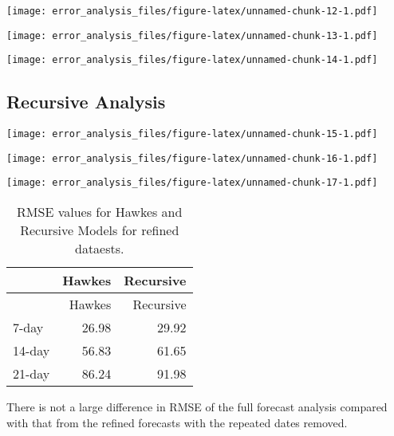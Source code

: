\documentclass[
]{article}
\begin{document}
\texttt{[image: error\_analysis\_files/figure-latex/unnamed-chunk-12-1.pdf]}

\texttt{[image: error\_analysis\_files/figure-latex/unnamed-chunk-13-1.pdf]}

\texttt{[image: error\_analysis\_files/figure-latex/unnamed-chunk-14-1.pdf]}

\hypertarget{recursive-analysis}{%
\subsection{Recursive Analysis}\label{recursive-analysis}}

\texttt{[image: error\_analysis\_files/figure-latex/unnamed-chunk-15-1.pdf]}

\texttt{[image: error\_analysis\_files/figure-latex/unnamed-chunk-16-1.pdf]}

\texttt{[image: error\_analysis\_files/figure-latex/unnamed-chunk-17-1.pdf]}

\begin{longtable}[]{@{}lrr@{}}
\caption{RMSE values for Hawkes and Recursive Models for refined
dataests.}\tabularnewline
\toprule
& Hawkes & Recursive\tabularnewline
\midrule
\endfirsthead
\toprule
& Hawkes & Recursive\tabularnewline
\midrule
\endhead
7-day & 26.98 & 29.92\tabularnewline
14-day & 56.83 & 61.65\tabularnewline
21-day & 86.24 & 91.98\tabularnewline
\bottomrule
\end{longtable}

There is not a large difference in RMSE of the full forecast analysis
compared with that from the refined forecasts with the repeated dates
removed.
\end{document}
